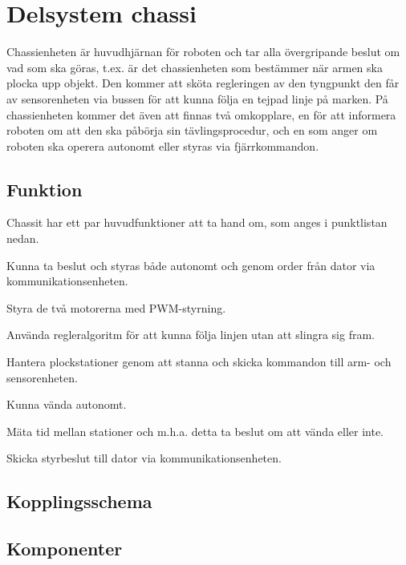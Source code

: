 
\section{Delsystem chassi}

Chassienheten är huvudhjärnan för roboten och tar alla övergripande beslut om vad som ska göras, t.ex. är det chassienheten som bestämmer när armen ska plocka upp objekt. Den kommer att sköta regleringen av den tyngpunkt den får av sensorenheten via bussen för att kunna följa en tejpad linje på marken. På chassienheten kommer det även att finnas två omkopplare, en för att informera roboten om att den ska påbörja sin tävlingsprocedur, och en som anger om roboten ska operera autonomt eller styras via fjärrkommandon.


\subsection{Funktion}

Chassit har ett par huvudfunktioner att ta hand om, som anges i punktlistan nedan.
\begin{packed_itemize}
\item Kunna ta beslut och styras både autonomt och genom order från dator via kommunikationsenheten.
\item Styra de två motorerna med PWM-styrning.
\item Använda regleralgoritm för att kunna följa linjen utan att slingra sig fram.
\item Hantera plockstationer genom att stanna och skicka kommandon till arm- och sensorenheten.
\item Kunna vända autonomt.
\item Mäta tid mellan stationer och m.h.a. detta ta beslut om att vända eller inte.
\item Skicka styrbeslut till dator via kommunikationsenheten.
\end{packed_itemize}


\subsection{Kopplingsschema}



\subsection{Komponenter}

